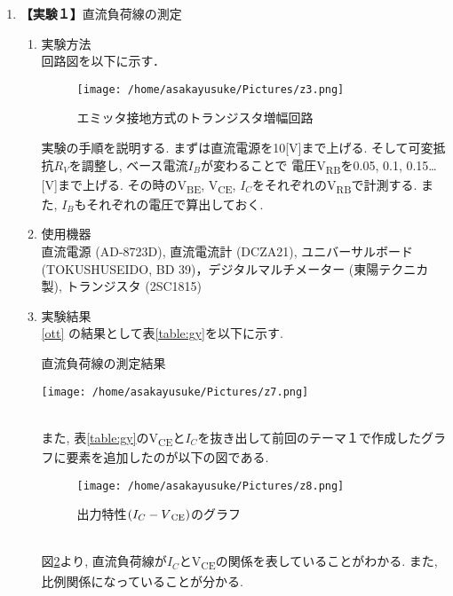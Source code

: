 \documentclass[uplatex,a4paper,11pt,dvipdfmxs]{jsarticle}
\begin{document}
\begin{enumerate}
    \item {\bf \large 【実験１】}{\large 直流負荷線の測定}\\
    \label{ott}
    \begin{enumerate}
    \item[3.1] 実験方法\\
    回路図を以下に示す．
    \begin{figure}[H]
    \centering
    \texttt{[image: /home/asakayusuke/Pictures/z3.png]}
    \caption{エミッタ接地方式のトランジスタ増幅回路}
    \label{figure:i}
    \end{figure}
    実験の手順を説明する. まずは直流電源を10[V]まで上げる. そして可変抵抗\(R_V\)を調整し, ベース電流\(I_B\)が変わることで
    電圧V\textsubscript{RB}を0.05, 0.1, 0.15\dots [V]まで上げる. その時のV\textsubscript{BE}, V\textsubscript{CE}, 
    \(I_C\)をそれぞれのV\textsubscript{RB}で計測する. また, \(I_B\)もそれぞれの電圧で算出しておく.\\

    \item[3.2] 使用機器\\
    直流電源 (AD-8723D), 直流電流計 (DCZA21), ユニバーサルボード (TOKUSHUSEIDO, BD 39)，デジタルマルチメーター (東陽テクニカ製), 
    トランジスタ (2SC1815)\\

    \item[3.3] 実験結果\\
    \ref{ott}
    の結果として表\ref{table:gy}を以下に示す.
    \begin{table}[H]
        \caption{直流負荷線の測定結果}
        \label{table:gy}
        \centering
        \texttt{[image: /home/asakayusuke/Pictures/z7.png]}
    \end{table}
    \\

    また, 表\ref{table:gy}のV\textsubscript{CE}と\(I_C\)を抜き出して前回のテーマ１で作成したグラフに要素を追加したのが以下の図である.\\
    \begin{figure}[H]
        \centering
        \texttt{[image: /home/asakayusuke/Pictures/z8.png]}
        \caption{出力特性\((I_C-V\textsubscript{CE})\)のグラフ}
        \label{figure:gr1}
    \end{figure}
    \\
    図\ref{figure:gr1}より, 直流負荷線が\(I_C\)とV\textsubscript{CE}の関係を表していることがわかる. 
    また, 比例関係になっていることが分かる.\\


\end{enumerate}
\end{enumerate}
\end{document}
